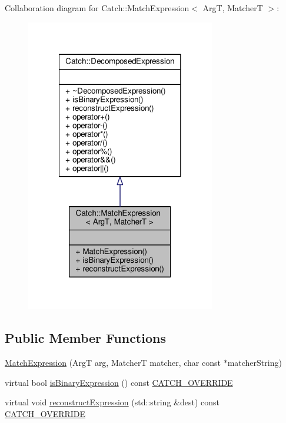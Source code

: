 Collaboration diagram for Catch\-:\-:Match\-Expression$<$ Arg\-T, Matcher\-T $>$\-:
\nopagebreak
\begin{figure}[H]
\begin{center}
\leavevmode
\includegraphics[width=234pt]{class_catch_1_1_match_expression__coll__graph}
\end{center}
\end{figure}
\subsection*{Public Member Functions}
\begin{DoxyCompactItemize}
\item 
\hyperlink{class_catch_1_1_match_expression_a506f25bad7970cb35f9dbe54763a8ca5}{Match\-Expression} (Arg\-T arg, Matcher\-T matcher, char const $\ast$matcher\-String)
\item 
virtual bool \hyperlink{class_catch_1_1_match_expression_ac4edf6e9a6e5762a487db1486d0d1f45}{is\-Binary\-Expression} () const \hyperlink{catch_8hpp_a8ecdce4d3f57835f707915ae831eb847}{C\-A\-T\-C\-H\-\_\-\-O\-V\-E\-R\-R\-I\-D\-E}
\item 
virtual void \hyperlink{class_catch_1_1_match_expression_a4410a93bc5b8241eb2502f400fce7ec4}{reconstruct\-Expression} (std\-::string \&dest) const \hyperlink{catch_8hpp_a8ecdce4d3f57835f707915ae831eb847}{C\-A\-T\-C\-H\-\_\-\-O\-V\-E\-R\-R\-I\-D\-E}
\end{DoxyCompactItemize}


